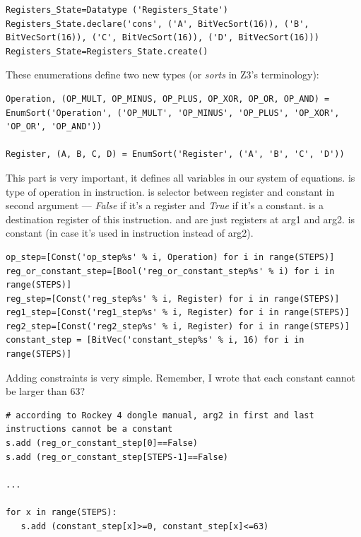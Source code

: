 \begin{lstlisting}
Registers_State=Datatype ('Registers_State')
Registers_State.declare('cons', ('A', BitVecSort(16)), ('B', BitVecSort(16)), ('C', BitVecSort(16)), ('D', BitVecSort(16)))
Registers_State=Registers_State.create()
\end{lstlisting}

These enumerations define two new types (or \textit{sorts} in Z3's terminology):

\begin{lstlisting}
Operation, (OP_MULT, OP_MINUS, OP_PLUS, OP_XOR, OP_OR, OP_AND) = EnumSort('Operation', ('OP_MULT', 'OP_MINUS', 'OP_PLUS', 'OP_XOR', 'OP_OR', 'OP_AND'))

Register, (A, B, C, D) = EnumSort('Register', ('A', 'B', 'C', 'D'))
\end{lstlisting}

This part is very important, it defines all variables in our system of equations. 
 is type of operation in instruction.
 is selector between register and constant in second argument ---
\textit{False} if it's a register and \textit{True} if it's a constant. 
 is a destination register of this instruction. 
 and  are just registers at arg1 and arg2. 
 is constant (in case it's used in instruction instead of arg2).

\begin{lstlisting}
op_step=[Const('op_step%s' % i, Operation) for i in range(STEPS)]
reg_or_constant_step=[Bool('reg_or_constant_step%s' % i) for i in range(STEPS)]
reg_step=[Const('reg_step%s' % i, Register) for i in range(STEPS)]
reg1_step=[Const('reg1_step%s' % i, Register) for i in range(STEPS)]
reg2_step=[Const('reg2_step%s' % i, Register) for i in range(STEPS)]
constant_step = [BitVec('constant_step%s' % i, 16) for i in range(STEPS)]
\end{lstlisting}

Adding constraints is very simple. Remember, I wrote that each constant cannot be larger than 63?

\begin{lstlisting}
# according to Rockey 4 dongle manual, arg2 in first and last instructions cannot be a constant
s.add (reg_or_constant_step[0]==False)
s.add (reg_or_constant_step[STEPS-1]==False)

...

for x in range(STEPS):
   s.add (constant_step[x]>=0, constant_step[x]<=63)
\end{lstlisting}

